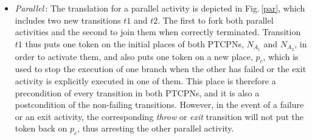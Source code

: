 \begin{itemize}
\item {\it Parallel}\,: The translation for a parallel activity is depicted
in Fig.\,\ref{par}, which includes two new transitions $t1$ and
$t2$. The first to fork both parallel activities
and the second to join them when correctly terminated. 
Transition $t1$ thus puts one token on the initial places of both
PTCPNs, $N_{A_1}$ and $N_{A_2}$, in order to activate them,
and also puts one token on a new place, $p_c$, which is
used to stop the execution of one branch when the other has
failed or the exit activity is explicitly executed in one of them.
This place is therefore a precondition of every 
transition in both PTCPNs, and it is also a postcondition
of the non-failing transitions. However, in the event
of a failure or an exit activity, the corresponding {\em throw} or {\em exit}  transition
will not put the token back on $p_c$, thus
arresting the other parallel activity.


\end{itemize}

